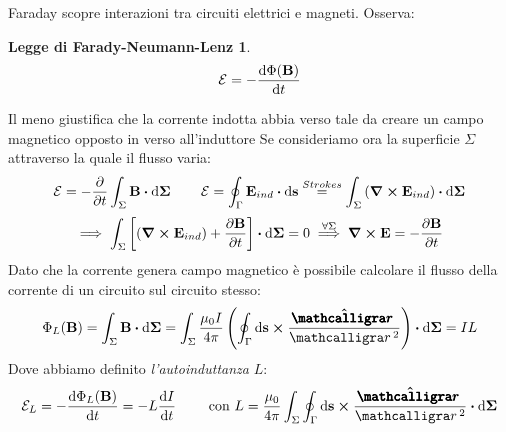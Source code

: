\documentclass[12pt,a4paper]{article}
\begin{document}
Faraday scopre interazioni tra circuiti elettrici e magneti. Osserva:
\newtheorem*{FNL}{Legge di Farady-Neumann-Lenz}
\begin{FNL}
    \begin{equation*}
        \mathcal{E}= - \dv{\Phi(\vb{B})}{t}
    \end{equation*}
\end{FNL}
Il meno giustifica che la corrente indotta abbia verso tale da creare un campo magnetico opposto in verso all'induttore
Se consideriamo ora la superficie $\Sigma$ attraverso la quale il flusso varia:
\begin{equation*}
    \mathcal{E}= - \pdv{}{t}\int_\Sigma\vb{B}\vdot\dd{\vb{\Sigma}}\qquad \mathcal{E}= \oint_\Gamma 
    \vb{E}_{ind}\vdot \dd{\vb{s}}\overset{Strokes}{=} \int_\Sigma\left( \curl{\vb{E}_{ind}} \right)\vdot\dd{\vb{\Sigma}}
\end{equation*}
\begin{equation*}
    \implies \int_\Sigma\left[ \left( \curl{\vb{E}_{ind}} \right)+\pdv{\vb{B}}{t} \right]\vdot\dd{\vb{\Sigma}}= 0
    \overset{\forall\Sigma}{\implies} \curl{\vb{E}}= -\pdv{\vb{B}}{t}
\end{equation*}
Dato che la corrente genera campo magnetico è possibile calcolare il flusso della corrente di un circuito sul circuito stesso:
\begin{equation*}
    \Phi_L(\vb{B})= \int_\Sigma\vb{B}\vdot\dd{\vb{\Sigma}}= \int_\Sigma\frac{\mu_0I}{4\pi}
    \left( \oint_\Gamma \dd{\vb{s}}\cp \frac{\vu{\boldscriptr}}{\scriptr^2} \right)\vdot \dd{\vb{\Sigma}}= IL
\end{equation*}
Dove abbiamo definito \textit{l'autoinduttanza} $L$:
\begin{equation*}
    \mathcal{E}_L= - \dv{\Phi_L(\vb{B})}{t}= -L\dv{I}{t} \qquad \text{ con } L = \frac{\mu_0}{4\pi}\int_\Sigma\oint_\Gamma\dd{\vb{s}}\cp\frac{\vu{\boldscriptr}}{\scriptr^2}\vdot \dd{\vb{\Sigma}}
\end{equation*}
\end{document}
